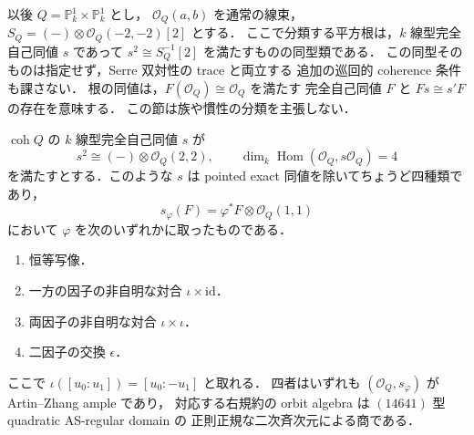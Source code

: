 以後 $Q=\mathbb P^1_k\times\mathbb P^1_k$ とし，
$\mathcal O_Q(a,b)$ を通常の線束，
$S_Q=(-)\otimes\mathcal O_Q(-2,-2)[2]$ とする．
ここで分類する平方根は，$k$ 線型完全自己同値 $s$ であって
$s^2\cong S_Q^{-1}[2]$ を満たすものの同型類である．
この同型そのものは指定せず，Serre 双対性の trace と両立する
追加の巡回的 coherence 条件も課さない．
根の同値は，$F(\mathcal O_Q)\cong\mathcal O_Q$ を満たす
完全自己同値 $F$ と $Fs\cong s'F$ の存在を意味する．
この節は族や慣性の分類を主張しない．

\begin{theorem}[四つの平方根]
\label{thm:commutative-four-roots}
$\operatorname{coh}Q$ の $k$ 線型完全自己同値 $s$ が
\[
 s^2\cong(-)\otimes\mathcal O_Q(2,2),
 \qquad \dim_k\operatorname{Hom}(\mathcal O_Q,s\mathcal O_Q)=4
 \tag{$*$}\label{eq:commutative-root-conditions}
\]
を満たすとする．このような $s$ は pointed exact 同値を除いてちょうど四種類であり，
\[
 s_\varphi(F)=\varphi^*F\otimes\mathcal O_Q(1,1)
\]
において $\varphi$ を次のいずれかに取ったものである．
\begin{enumerate}
 \item 恒等写像．
 \item 一方の因子の非自明な対合 $\iota\times\mathrm{id}$．
 \item 両因子の非自明な対合 $\iota\times\iota$．
 \item 二因子の交換 $\epsilon$．
\end{enumerate}
ここで $\iota([u_0:u_1])=[u_0:-u_1]$ と取れる．
四者はいずれも $(\mathcal O_Q,s_\varphi)$ が Artin--Zhang ample であり，
対応する右規約の orbit algebra は $(14641)$ 型 quadratic AS-regular domain の
正則正規な二次斉次元による商である．
\end{theorem}

